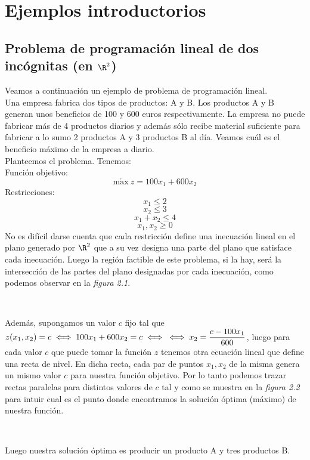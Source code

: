 \section{Ejemplos introductorios}
\subsection{Problema de programación lineal de dos incógnitas (en $\R^2$)}
\begin{ejem} Veamos a continuación un ejemplo de problema de programación lineal.\\

Una empresa fabrica dos tipos de productos: A y B. Los productos A y B generan unos beneficios de 100 y 600 euros respectivamente. La empresa no puede fabricar más de 4 productos diarios y además sólo recibe material suficiente para fabricar a lo sumo 2 productos A y 3 productos B al día. Veamos cuál es el beneficio máximo de la empresa a diario.\\

Planteemos el problema. Tenemos:\\
Función objetivo:
\[\mathrm{m\acute{a}x}\ z = 100x_1 + 600x_2\]
Restricciones:
\[x_1\leq 2\]
\[x_2\leq 3\]
\[x_1+x_2\leq 4\]
\[x_1,x_2\geq 0\]
No es difícil darse cuenta que cada restricción define una inecuación lineal en el plano generado por $\R^2$ que a su vez designa una parte del plano que satisface cada inecuación. Luego la región factible de este problema, si la hay, será la intersección de las partes del plano designadas por cada inecuación, como podemos observar en la \textit{figura 2.1}.
\begin{figura}\ \begin{center} \end{center} \end{figura}
Además, supongamos un valor $c$ fijo tal que $z(x_1,x_2)=c \iff 100x_1+600x_2=c\iff\\
\iff x_2=\dfrac{c-100x_1}{600}$, luego para cada valor $c$ que puede tomar la función $z$ tenemos otra ecuación lineal que define una recta de nivel. En dicha recta, cada par de puntos $x_1,x_2$ de la misma genera un mismo valor $c$ para nuestra función objetivo. Por lo tanto podemos trazar rectas paralelas para distintos valores de $c$ tal y como se muestra en la \textit{figura 2.2} para intuir cual es el punto donde encontramos la solución óptima (máximo) de nuestra función.
\newpage
\begin{figura}\ \begin{center}\end{center}\end{figura}
Luego nuestra solución óptima es producir un producto A y tres productos B.
\end{ejem}

